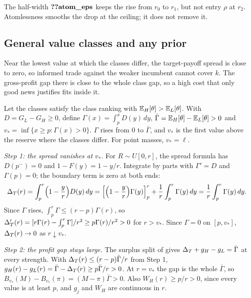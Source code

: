 \begin{caution}
The half-width \(\reg{atom_eps}\) keeps the rise from \(r_0\) to \(r_1\), but not entry \(\rho\) at \(r_2\).
Atomlessness smooths the drop at the ceiling; it does not remove it.
\end{caution}

\subsection{General value classes and any prior}\label{sec:10_robustness-classes}

\begin{intuition}
Near the lowest value at which the classes differ, the target-payoff spread is close to zero, so informed trade
against the weaker incumbent cannot cover \(k\). The gross-profit gap there is close to the whole class gap, so a
high cost that only good news justifies fits inside it.
\end{intuition}

Let the classes satisfy the class ranking with \(\mathbb{E}_H[\theta]>\mathbb{E}_L[\theta]\). With \(D=G_L-G_H\ge0\), define
\(\Gamma(x)=\int_p^xD(y)\,dy\), \(\bar\Gamma=\mathbb{E}_H[\theta]-\mathbb{E}_L[\theta]>0\) and \(v_*=\inf\{x\ge p:\Gamma(x)>0\}\).
\(\Gamma\) rises from \(0\) to \(\bar\Gamma\), and \(v_*\) is the first value above the reserve where the classes differ.
For point masses, \(v_*=\ell\).

\emph{Step 1: the spread vanishes at \(v_*\).} For \(R\sim U[0,r]\), the spread formula  has \(D(p^-)=0\) and
\(1-F(y)=1-y/r\). Integrate by parts with \(\Gamma'=D\) and \(\Gamma(p)=0\); the boundary term is zero at both ends:
\[
\Delta_T(r)=\int_p^r\Bigl(1-\frac yr\Bigr)D(y)\,dy
=\Bigl[\Bigl(1-\frac yr\Bigr)\Gamma(y)\Bigr]_p^r+\frac1r\int_p^r\Gamma(y)\,dy
=\frac1r\int_p^r\Gamma(y)\,dy .
\]
Since \(\Gamma\) rises, \(\int_p^r\Gamma\le(r-p)\Gamma(r)\), so
\(\Delta_T'(r)=[r\Gamma(r)-\int_p^r\Gamma]/r^2\ge p\Gamma(r)/r^2>0\) for \(r>v_*\). Since \(\Gamma=0\) on \([p,v_*]\),
\(\Delta_T(r)\to0\) as \(r\downarrow v_*\).

\emph{Step 2: the profit gap stays large.} The surplus split of  gives
\(\Delta_T+g_H-g_L=\bar\Gamma\) at every strength. With \(\Delta_T(r)\le(r-p)\bar\Gamma/r\) from Step 1,
\(g_H(r)-g_L(r)=\bar\Gamma-\Delta_T(r)\ge p\bar\Gamma/r>0\). At \(r=v_*\) the gap is the whole \(\bar\Gamma\), so
\(B_{v_*}(M)-B_{v_*}(\pi)=(M-\pi)\bar\Gamma>0\). Also \(W_H(r)\ge p/r>0\), since every value is at least \(p\), and
\(g_j\) and \(W_H\) are continuous in \(r\).

